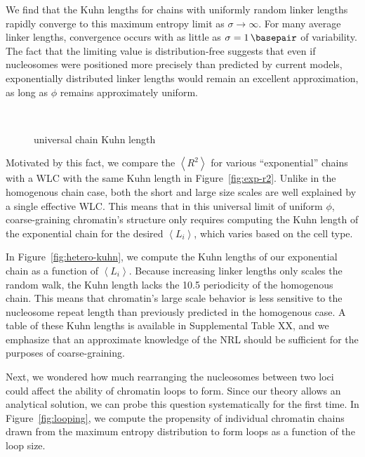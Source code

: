 \documentclass[%
 reprint,
superscriptaddress,
showpacs,preprintnumbers,
 amsmath,amssymb,
 aps,
 prl,
]{revtex4-1}
\newcommand{\RR}{\left\langle{}R^2\right\rangle{}}
\newcommand{\meanli}{\left\langle{}L_i\right\rangle}
\begin{document}
We find that the Kuhn lengths for chains with uniformly random linker lengths rapidly converge to this
maximum entropy limit as $\sigma\to\infty$. For many average linker lengths,
convergence occurs with as little as $\sigma=\SI{1}{\basepair}$ of variability. 
The fact that the limiting value is distribution-free suggests that even if nucleosomes were positioned more precisely than predicted by current models, exponentially distributed linker lengths would remain an excellent approximation, as long as $\phi$ remains approximately uniform.

\begin{figure}
    \centering
    \mbox{%
    }\caption{universal chain Kuhn length}\label{fig:exp-chain}
\end{figure}


Motivated by this fact, we compare the $\RR$ for various
    ``exponential'' chains  with a WLC with the same Kuhn length in Figure~\ref{fig:exp-r2}.
Unlike in the homogenous chain case, both the short and large size scales are
    well explained by a single effective WLC.\@
This means that in this universal limit of uniform $\phi$, coarse-graining
    chromatin's structure only requires  computing the Kuhn length of the
    exponential chain for the desired $\meanli$, which varies based on the cell
    type.

In Figure~\ref{fig:hetero-kuhn}, we compute the Kuhn lengths of our exponential
    chain as a function of $\meanli$.
Because increasing linker lengths only scales the random walk, the Kuhn length
    lacks the \SI{10.5}{\basepair} periodicity of the homogenous chain.
This means that chromatin's large scale behavior is less sensitive to
    the nucleosome repeat length than previously predicted in the homogenous
    case.
A table of these Kuhn lengths is available in Supplemental Table XX, and we
    emphasize that an approximate knowledge of the NRL should be sufficient for
    the purposes of coarse-graining.

Next, we wondered how much rearranging the nucleosomes between two
    loci could affect the ability of chromatin loops to form.
Since our theory allows an analytical solution, we can probe this question
    systematically for the first time.
In Figure~\ref{fig:looping}, we compute the propensity of individual chromatin
    chains drawn from the maximum entropy distribution to form loops as a
    function of the loop size.
\end{document}
